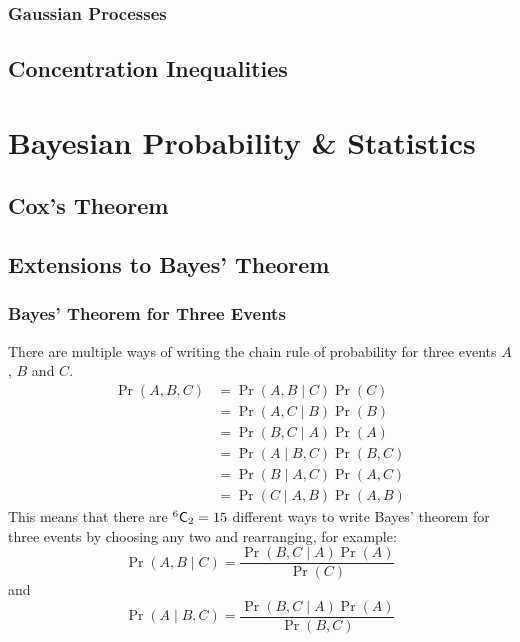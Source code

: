 \documentclass[11pt]{report} %
\begin{document}
\subsection{Gaussian Processes}

\section{Concentration Inequalities}

\chapter{Bayesian Probability \& Statistics}

\section{Cox's Theorem}

\section{Extensions to Bayes' Theorem}

\subsection{Bayes' Theorem for Three Events}

There are multiple ways of writing the chain rule of probability for three events $A$, $B$ and $C$.
\begin{align}
\operatorname{Pr}\left(A, B, C\right) &= \operatorname{Pr}\left(A, B\middle|C\right)\operatorname{Pr}\left(C\right) \\
&= \operatorname{Pr}\left(A, C\middle|B\right)\operatorname{Pr}\left(B\right) \\
&= \operatorname{Pr}\left(B, C\middle|A\right)\operatorname{Pr}\left(A\right) \\
&= \operatorname{Pr}\left(A\middle|B, C\right)\operatorname{Pr}\left(B, C\right) \\
&= \operatorname{Pr}\left(B\middle|A, C\right)\operatorname{Pr}\left(A, C\right) \\
&= \operatorname{Pr}\left(C\middle|A, B\right)\operatorname{Pr}\left(A, B\right)
\end{align}
This means that there are $\mathstrut^{6}\mathsf{C}_{2} = 15$ different ways to write Bayes' theorem for three events by choosing any two and rearranging, for example:
\begin{equation}
\operatorname{Pr}\left(A, B\middle|C\right) = \dfrac{\operatorname{Pr}\left(B, C\middle|A\right)\operatorname{Pr}\left(A\right)}{\operatorname{Pr}\left(C\right)}
\end{equation}
and
\begin{equation}
\operatorname{Pr}\left(A\middle|B, C\right) = \dfrac{\operatorname{Pr}\left(B, C\middle|A\right)\operatorname{Pr}\left(A\right)}{\operatorname{Pr}\left(B, C\right)}
\end{equation}
\end{document}
